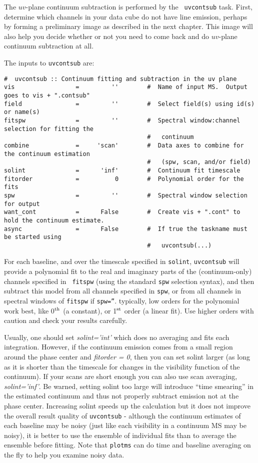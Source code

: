 The $uv$-plane continuum subtraction is performed by the {\tt
  uvcontsub} task.  First, determine which channels in your data cube
do not have line emission, perhaps by forming a preliminary image as
described in the next chapter.  This image will also help you decide
whether or not you need to come back and do $uv$-plane continuum
subtraction at all. 


The inputs to {\tt uvcontsub} are:
\small
\begin{verbatim}
#  uvcontsub :: Continuum fitting and subtraction in the uv plane
vis                 =         ''        #  Name of input MS.  Output goes to vis + ".contsub"
field               =         ''        #  Select field(s) using id(s) or name(s)
fitspw              =         ''        #  Spectral window:channel selection for fitting the
                                        #   continuum
combine             =     'scan'        #  Data axes to combine for the continuum estimation
                                        #   (spw, scan, and/or field)
solint              =      'inf'        #  Continuum fit timescale
fitorder            =          0        #  Polynomial order for the fits
spw                 =         ''        #  Spectral window selection for output
want_cont           =      False        #  Create vis + ".cont" to hold the continuum estimate.
async               =      False        #  If true the taskname must be started using
                                        #   uvcontsub(...)
\end{verbatim}

For each baseline, and over the timescale specified in {\tt solint},
{\tt uvcontsub} will provide a polynomial fit to the real and
imaginary parts of the (continuum-only) channels specified in {\tt
fitspw} (using the standard {\tt spw} selection syntax), 
and then subtract this model from all channels specified in {\tt spw}, or
from all channels in spectral windows of {\tt fitspw} if {\tt spw=''}.
typically, low orders for the polynomial work best, like 0$^{\rm th}$ (a
constant), or 1$^{\rm st}$ order (a linear fit). Use higher orders with caution
and check your results carefully.

Usually, one should set {\it solint='int'} which does no averaging and fits
each integration. However, if the continuum emission comes from a small
region around the phase center and {\it fitorder = 0}, then you can set solint
larger (as long as it is shorter than the timescale for changes in the
visibility function of the continuum).  If your scans are short enough you
can also use scan averaging, {\it solint='inf'}. Be warned, setting solint too
large will introduce ``time smearing'' in the estimated continuum and thus
not properly subtract emission not at the phase center.  Increasing solint
speeds up the calculation but it does not improve the overall result
quality of {\tt uvcontsub} - although the continuum estimates of each baseline
may be noisy (just like each visibility in a continuum MS may be noisy),
it is better to use the ensemble of individual fits than to average the
ensemble before fitting.  Note that {\tt plotms} can do time and baseline
averaging on the fly to help you examine noisy data.


